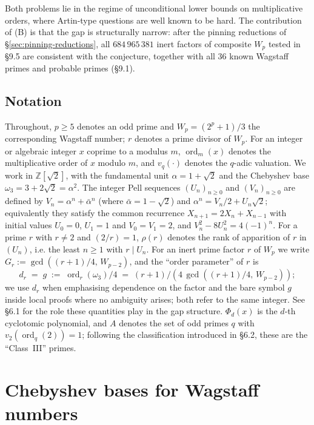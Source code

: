 \documentclass[12pt]{article}
\theoremstyle{plain}
\theoremstyle{definition}
\theoremstyle{remark}
\begin{document}
Both problems lie in the regime of unconditional lower bounds on
multiplicative orders, where Artin-type questions are well known
to be hard. The contribution of (B) is that the gap is
structurally narrow: after the pinning reductions of
\S\ref{sec:pinning-reductions}, all \(684\,965\,381\) inert
factors of composite \(W_p\) tested in \S9.5 are consistent with
the conjecture, together with all 36 known Wagstaff primes and
probable primes (\S9.1).

\subsection{Notation}


Throughout, \(p \geq 5\) denotes an odd prime and
\(W_p = (2^p+1)/3\) the corresponding Wagstaff number; \(r\) denotes
a prime divisor of \(W_p\). For an integer or algebraic integer
\(x\) coprime to a modulus \(m\), \(\operatorname{ord}_m(x)\) denotes
the multiplicative order of \(x\) modulo \(m\), and \(v_q(\cdot)\)
denotes the \(q\)-adic valuation. We work in
\(\mathbb{Z}[\sqrt{2}]\), with the fundamental unit
\(\alpha = 1 + \sqrt{2}\) and the Chebyshev base
\(\omega_3 = 3 + 2\sqrt{2} = \alpha^2\). The integer Pell sequences
\((U_n)_{n \geq 0}\) and \((V_n)_{n \geq 0}\) are defined by
\(V_n = \alpha^n + \bar{\alpha}^n\) (where
\(\bar{\alpha} = 1 - \sqrt{2}\)) and
\(\alpha^n = V_n/2 + U_n\sqrt{2}\); equivalently they satisfy the
common recurrence \(X_{n+1} = 2X_n + X_{n-1}\) with initial values
\(U_0 = 0\), \(U_1 = 1\) and \(V_0 = V_1 = 2\), and
\(V_n^2 - 8U_n^2 = 4(-1)^n\). For a prime \(r\)
with \(r \neq 2\) and \((2/r) = 1\), \(\rho(r)\) denotes the rank
of apparition of \(r\) in \((U_n)\), i.e. the least \(n \geq 1\)
with \(r \mid U_n\). For an inert prime factor \(r\) of \(W_p\)
we write \(G_r := \gcd((r+1)/4,\, W_{p-2})\), and the ``order
parameter'' of \(r\) is
\[
  d_r \;=\; g \;:=\; \operatorname{ord}_r(\omega_3)/4
  \;=\; (r+1)/(4\,\gcd((r+1)/4,\,W_{p-2}));
\]
we use \(d_r\) when emphasising dependence on the factor and the
bare symbol \(g\) inside local proofs where no ambiguity arises;
both refer to the same integer. See \S6.1 for the role these
quantities play in the gap structure.
\(\Phi_d(x)\) is the \(d\)-th cyclotomic polynomial, and \(A\)
denotes the set of odd primes \(q\) with
\(v_2(\operatorname{ord}_q(2)) = 1\); following the classification
introduced in \S6.2, these are the ``Class~III'' primes.



\section{Chebyshev bases for Wagstaff numbers}
\end{document}
